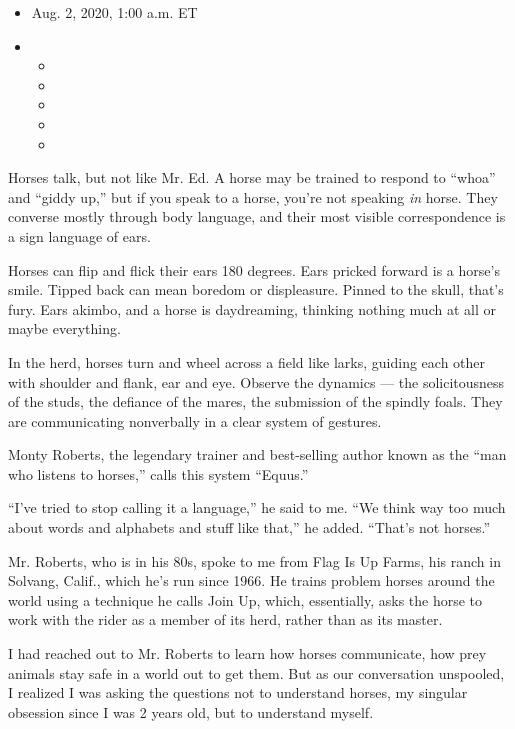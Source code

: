 \begin{itemize}
\item
  Aug. 2, 2020, 1:00 a.m. ET
\item
  \begin{itemize}
  \item
  \item
  \item
  \item
  \item
  \end{itemize}
\end{itemize}

Horses talk, but not like Mr. Ed. A horse may be trained to respond to
``whoa'' and ``giddy up,'' but if you speak to a horse, you're not
speaking \emph{in} horse. They converse mostly through body language,
and their most visible correspondence is a sign language of ears.

Horses can flip and flick their ears 180 degrees. Ears pricked forward
is a horse's smile. Tipped back can mean boredom or displeasure. Pinned
to the skull, that's fury. Ears akimbo, and a horse is daydreaming,
thinking nothing much at all or maybe everything.

In the herd, horses turn and wheel across a field like larks, guiding
each other with shoulder and flank, ear and eye. Observe the dynamics
--- the solicitousness of the studs, the defiance of the mares, the
submission of the spindly foals. They are communicating nonverbally in a
clear system of gestures.

Monty Roberts, the legendary trainer and best-selling author known as
the ``man who listens to horses,'' calls this system ``Equus.''

``I've tried to stop calling it a language,'' he said to me. ``We think
way too much about words and alphabets and stuff like that,'' he added.
``That's not horses.''

Mr. Roberts, who is in his 80s, spoke to me from Flag Is Up Farms, his
ranch in Solvang, Calif., which he's run since 1966. He trains problem
horses around the world using a technique he calls Join Up, which,
essentially, asks the horse to work with the rider as a member of its
herd, rather than as its master.

I had reached out to Mr. Roberts to learn how horses communicate, how
prey animals stay safe in a world out to get them. But as our
conversation unspooled, I realized I was asking the questions not to
understand horses, my singular obsession since I was 2 years old, but to
understand myself.

